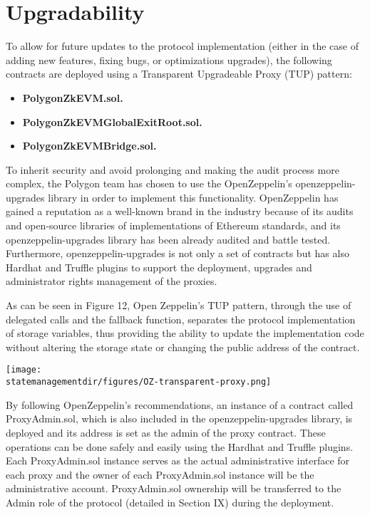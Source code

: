 \section{Upgradability}

To allow for future updates to the protocol implementation (either in the case of adding new features, fixing bugs, or optimizations upgrades), the following contracts are deployed using a Transparent Upgradeable Proxy (TUP) pattern:

\begin{itemize}
	\item \textbf{PolygonZkEVM.sol.}
	\item \textbf{PolygonZkEVMGlobalExitRoot.sol.}
	\item \textbf{PolygonZkEVMBridge.sol.}
\end{itemize}

To inherit security and avoid prolonging and making the audit process more complex, the Polygon team has chosen to use the OpenZeppelin's openzeppelin-upgrades library in order to implement this functionality. OpenZeppelin has gained a reputation as a well-known brand in the industry because of its audits and open-source libraries of implementations of Ethereum standards, and its openzeppelin-upgrades library has been already audited and battle tested. Furthermore, openzeppelin-upgrades is not only a set of contracts but has also Hardhat and Truffle plugins to support the deployment, upgrades and administrator rights management of the proxies.

As can be seen in Figure 12, Open Zeppelin's TUP pattern, through the use of delegated calls and the fallback function, separates the protocol implementation of storage variables, thus providing the ability to update the implementation code without altering the storage state or changing the public address of the contract.

\begin{center}
	\texttt{[image: \\statemanagementdir/figures/OZ-transparent-proxy.png]}
	
\end{center}

By following OpenZeppelin's recommendations, an instance of a contract called ProxyAdmin.sol, which is also included in the openzeppelin-upgrades library, is deployed and its address is set as the admin of the proxy contract. These operations can be done safely and easily using the Hardhat and Truffle plugins. Each ProxyAdmin.sol instance serves as the actual administrative interface for each proxy and the owner of each ProxyAdmin.sol instance will be the administrative account. ProxyAdmin.sol ownership will be transferred to the Admin role of the protocol (detailed in Section IX) during the deployment.

